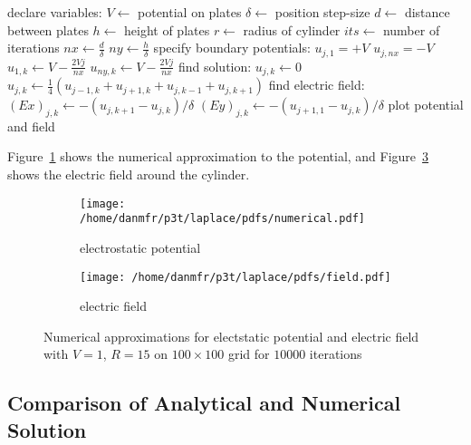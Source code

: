 \documentclass[12pt, a4paper]{article}
\begin{document}
\begin{algorithm}
\begin{algorithmic}[]
\State declare variables:
\State $V \gets$ potential on plates
\State $\delta \gets$ position step-size
\State $d \gets$ distance between plates
\State $h \gets$ height of plates
\State $r \gets$ radius of cylinder
\State $its \gets$ number of iterations
\State $nx \gets \frac{d}{\delta}$ 
\State $ny \gets \frac{h}{\delta}$ 
\State specify boundary potentials:
   \State $u_{j, 1} = +V$
   \State $u_{j, nx} = -V$
\EndFor
{}
   \State $u_{1, k} \gets V-\frac{2Vj}{nx}$
   \State $u_{ny, k} \gets V-\frac{2Vj}{nx}$
\EndFor
\State find solution:
            \State $u_{j, k} \gets 0$
         \Else
            \State $u_{j,k} \gets \frac{1}{4}(u_{j-1,k}+u_{j+1,k}+u_{j,k-1}+u_{j,k+1})$
         \EndIf
      \EndFor
   \EndFor
\EndFor
\State find electric field:
      \State $(Ex)_{j, k} \gets -\left(u_{j,k+1}-u_{j,k}\right)/\delta$
      \State $(Ey)_{j,k} \gets -\left(u_{j+1,1}-u_{j,k}\right)/\delta$
   \EndFor
\EndFor
\State plot potential and field
\EndProcedure
\end{algorithmic}
\end{algorithm}

Figure~\ref{fig:numerical} shows the numerical approximation to the potential,
and Figure~\ref{fig:field} shows the electric field around the cylinder.

\begin{figure}
\centering
\begin{subfigure}[b]{0.6\textwidth}
	\texttt{[image: /home/danmfr/p3t/laplace/pdfs/numerical.pdf]}
	\caption{electrostatic potential}
	\label{fig:numerical}
\end{subfigure}

\begin{subfigure}[b]{0.6\textwidth}
	\texttt{[image: /home/danmfr/p3t/laplace/pdfs/field.pdf]}
	\caption{electric field}
	\label{fig:field}
\end{subfigure}
\caption{Numerical approximations for electstatic potential and electric field with
$V=1$, $R=15$ on $100\times100$ grid for $10000$ iterations}
\end{figure}

\subsection{Comparison of Analytical and Numerical Solution}
\end{document}

